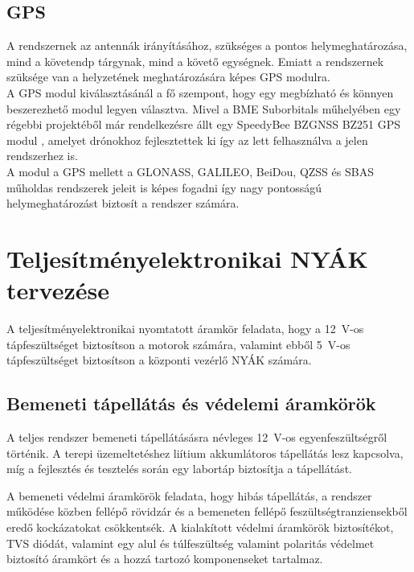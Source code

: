 \subsection{GPS}
\label{subsec:gps-kivalasztas}
A rendszernek az antennák irányításához, szükséges a pontos helymeghatározása, mind
a követendp tárgynak, mind a követő egységnek. Emiatt a rendszernek szüksége van a helyzetének meghatározására
képes GPS modulra. \\

A GPS modul kiválasztásánál a fő szempont, hogy egy megbízható és
könnyen beszerezhető modul legyen választva. Mivel a BME Suborbitals
műhelyében egy régebbi projektéből már rendelkezésre állt egy SpeedyBee
BZGNSS BZ251 GPS modul \cite{BZ251_datasheet}, amelyet drónokhoz fejlesztettek ki így az lett felhasználva a 
jelen rendszerhez is. \\

A modul a GPS mellett a GLONASS, GALILEO, BeiDou, QZSS és SBAS műholdas rendszerek jeleit is képes fogadni
így nagy pontosságú helymeghatározást biztosít a rendszer számára.


\section{Teljesítményelektronikai NYÁK tervezése}
\label{sec:teljesitmenyelektronika-NYAK}

A teljesítményelektronikai nyomtatott áramkör feladata, hogy a 12~V-os tápfeszültséget
biztosítson a motorok számára, valamint ebből 5~V-os tápfeszültséget biztosítson a központi vezérlő NYÁK
számára.


\subsection{Bemeneti tápellátás és védelemi áramkörök}
A teljes rendszer bemeneti tápellátásásra névleges 
12~V-os egyenfeszültségről történik. A terepi üzemeltetéshez liítium
akkumlátoros tápellátás lesz kapcsolva, míg a fejlesztés és tesztelés
során egy labortáp biztosítja a tápellátást.

A bemeneti védelmi áramkörök feladata, hogy hibás tápellátás, a rendszer 
működése közben fellépő rövidzár és a bemeneten fellépő feszültségtranziensekből
eredő kockázatokat csökkentsék.  A kialakított védelmi 
áramkörök biztosítékot, TVS diódát, valamint egy alul és túlfeszültség valamint
polaritás védelmet biztosító áramkört és a hozzá tartozó komponenseket tartalmaz.\vspace{0.1cm}\\

